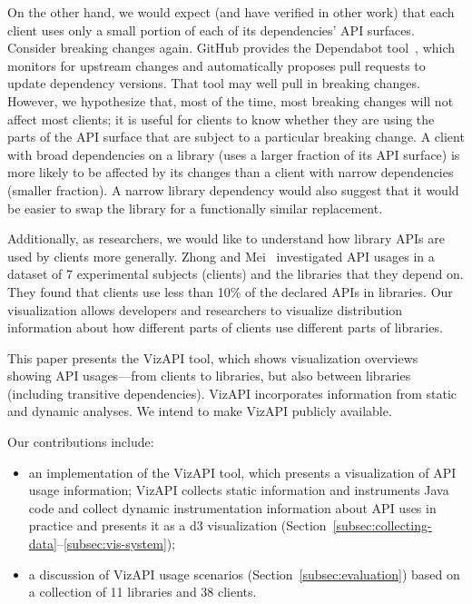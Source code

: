 On the other hand, we would expect (and have verified in other work) that each client uses only a small portion of each of its dependencies' API surfaces. Consider breaking changes again. GitHub provides the Dependabot tool~\cite{mullans20:_keep_depen}, which monitors for upstream changes and automatically proposes pull requests to update dependency versions. That tool may well pull in breaking changes. However, we hypothesize that, most of the time, most breaking changes will not affect most clients; it is useful for clients to know whether they are using the parts of the API surface that are subject to a particular breaking change. A client with broad dependencies on a library (uses a larger fraction of its API surface) is more likely to be affected by its changes than a client with narrow dependencies (smaller fraction). A narrow library dependency would also suggest that it would be easier to swap the library for a functionally similar replacement.

Additionally, as researchers, we would like to understand how library
APIs are used by clients more generally. Zhong and
Mei~\cite{zhong19:_empir_study_api_usages} investigated API usages in
a dataset of 7 experimental subjects (clients) and the libraries that
they depend on.  They found that clients use less than 10\% of the
declared APIs in libraries. Our visualization allows developers and
researchers to visualize distribution information about how different
parts of clients use different parts of libraries.

This paper presents the VizAPI tool, which shows visualization overviews showing API usages---from clients to libraries, but also between libraries (including transitive dependencies). VizAPI incorporates information from static and dynamic analyses. We intend to make VizAPI publicly available.

Our contributions include:
\begin{itemize}
\item an implementation of the VizAPI tool, which presents a visualization of API usage information; VizAPI collects static information and instruments Java code and collect dynamic instrumentation information about API uses in practice and presents it as a d3 visualization (Section~\ref{subsec:collecting-data}--\ref{subsec:vis-system});
\item a discussion of VizAPI usage scenarios (Section~\ref{subsec:evaluation}) based on a collection of 11 libraries and 38 clients.
\end{itemize}


